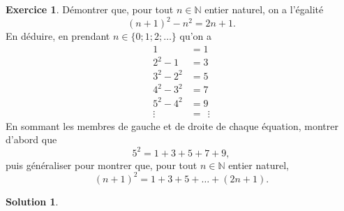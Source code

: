 \documentclass[a4paper, 14pt]{extarticle}
\theoremstyle{plain}
\newtheorem*{sol}{Solution}
\theoremstyle{definition}
\newtheorem{ex}{Exercice}
\newcommand{\N}{\mathbb{N}}
\newcommand{\exe}[2]{
		\begin{ex} #1  \end{ex}
		\begin{sol} #2 \end{sol}
	}
\newcommand{\exe}[2]{
		\begin{ex} #1  \end{ex}
	}
\begin{document}
	\exe{
		Démontrer que, pour tout $n\in\N$ entier naturel, on a l'égalité
			\[ (n+1)^2 -n^2 = 2n+1. \]
		En déduire, en prendant $n\in\{0;1;2; \dots\}$ qu'on a
			\begin{align*}
				1 &= 1 \\
				2^2 - 1 &= 3 \\
				3^2 - 2^2 &= 5 \\
				4^2 - 3^2 &= 7 \\
				5^2 - 4^2 &= 9 \\
					\vdots\quad \, &= \ \ \vdots
			\end{align*}
		En sommant les membres de gauche et de droite de chaque équation, montrer d'abord que
			\[ 5^2 = 1 + 3 + 5 + 7 + 9, \]
		puis généraliser pour montrer que, pour tout $n\in\N$ entier naturel,
			\[ (n+1)^2 = 1 + 3 + 5 + \dots + (2n+1). \]
	}{}
\end{document}
